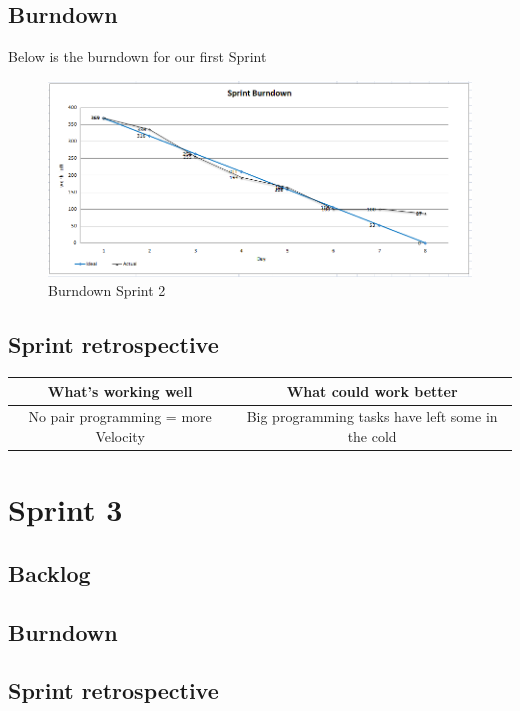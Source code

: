 \documentclass[]{report}
\begin{document}
\section{Burndown}
Below is the burndown for our first Sprint
\begin{figure}[h]
\includegraphics[scale=0.55]{img/burndownSprint2.png}
\caption{Burndown Sprint 2}
\label{fig:Burndown Sprint 2}
\end{figure}


\section{Sprint retrospective}

\begin{center}
\begin{tabular}{|c|c|}
\hline \textbf{What's working well} & \textbf{What could work better} \\ 
\hline No pair programming = more Velocity & Big programming tasks have left some in the cold \\ 
\hline 
\end{tabular} 
\end{center}




\newpage
\chapter{Sprint 3}
\label{chap:Spring 3}

\section{Backlog}


\section{Burndown}


\section{Sprint retrospective}
\end{document}
